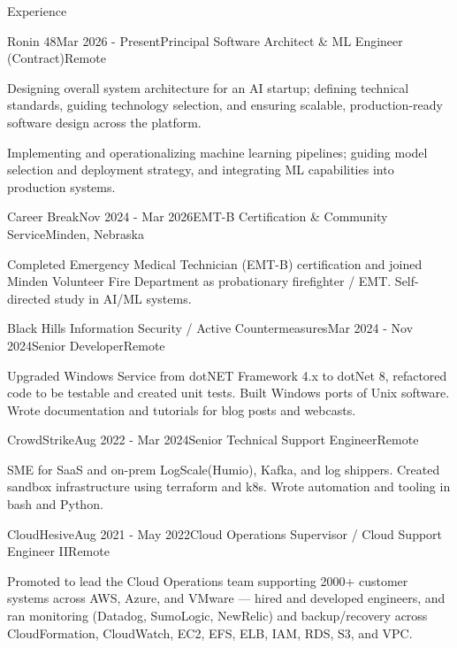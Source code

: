\documentclass{resume} %
\begin{document}

\begin{rSection}{Experience}

\begin{rSubsection}{Ronin 48}{Mar 2026 - Present}{Principal Software Architect \& ML Engineer (Contract)}{Remote}
	\item Designing overall system architecture for an AI startup; defining technical standards, guiding technology selection, and ensuring scalable, production-ready software design across the platform.
	\item Implementing and operationalizing machine learning pipelines; guiding model selection and deployment strategy, and integrating ML capabilities into production systems.
\end{rSubsection}

\begin{rSubsection}{Career Break}{Nov 2024 - Mar 2026}{EMT-B Certification \& Community Service}{Minden, Nebraska}
	\item Completed Emergency Medical Technician (EMT-B) certification and joined Minden Volunteer Fire Department as probationary firefighter / EMT. Self-directed study in AI/ML systems.
\end{rSubsection}

\begin{rSubsection}{Black Hills Information Security / Active Countermeasures}{Mar 2024 - Nov 2024}{Senior Developer}{Remote}
	\item Upgraded Windows Service from dotNET Framework 4.x to dotNet 8, refactored code to be testable and created unit tests. Built Windows ports of Unix software. Wrote documentation and tutorials for blog posts and webcasts.
\end{rSubsection}

\begin{rSubsection}{CrowdStrike}{Aug 2022 - Mar 2024}{Senior Technical Support Engineer}{Remote}
	\item SME for SaaS and on-prem LogScale(Humio), Kafka, and log shippers. Created sandbox infrastructure using terraform and k8s. Wrote automation and tooling in bash and Python.
\end{rSubsection}

\begin{rSubsection}{CloudHesive}{Aug 2021 - May 2022}{Cloud Operations Supervisor / Cloud Support Engineer II}{Remote}
\item Promoted to lead the Cloud Operations team supporting 2000+ customer systems across AWS, Azure, and VMware --- hired and developed engineers, and ran monitoring (Datadog, SumoLogic, NewRelic) and backup/recovery across CloudFormation, CloudWatch, EC2, EFS, ELB, IAM, RDS, S3, and VPC.
\end{rSubsection}


\end{rSection}
\end{document}
